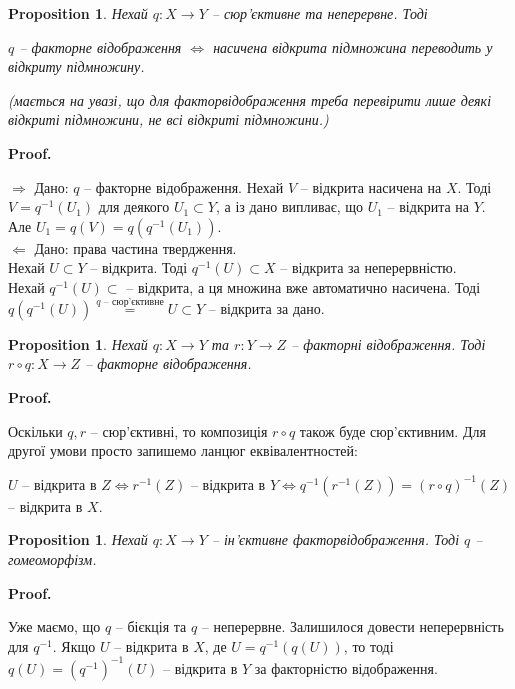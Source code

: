 \documentclass[a4paper, 10pt]{article}
\makeatletter
\def\rightproof{$\boxed{\Rightarrow}$ }
\def\leftproof{$\boxed{\Leftarrow}$ }
\theoremstyle{theoremdd}
\newtheorem{proposition}[theorem]{Proposition}
\renewenvironment{proof}[1][Proof.\\]{\par
\pushQED{\hfill \qed}%
\normalfont \topsep6\p@\@plus6\p@\relax
\trivlist
\item\relax
{\bfseries
#1\@addpunct{.}}\hspace\labelsep\ignorespaces
}{%
\popQED\endtrivlist\@endpefalse
}
\makeatother
\begin{document}
\begin{proposition}
Нехай $q \colon X \to Y$ -- сюр'єктивне та неперервне. Тоді
\begin{center}
$q$ -- факторне відображення $\iff$ насичена відкрита підмножина переводить у відкриту підмножину.
\end{center}
(\textit{мається на увазі, що для факторвідображення треба перевірити лише деякі відкриті підмножини, не всі відкриті підмножини}.)
\end{proposition}

\begin{proof}
\rightproof Дано: $q$ -- факторне відображення. Нехай $V$ -- відкрита насичена на $X$. Тоді $V = q^{-1}(U_1)$ для деякого $U_1 \subset Y$, а із дано випливає, що $U_1$ -- відкрита на $Y$. Але $U_1 = q(V) = q(q^{-1}(U_1))$.
\bigskip \\
\leftproof Дано: права частина твердження.\\
Нехай $U \subset Y$ -- відкрита. Тоді $q^{-1}(U) \subset X$ -- відкрита за неперервністю.\\
Нехай $q^{-1}(U) \subset$ -- відкрита, а ця множина вже автоматично насичена. Тоді $q(q^{-1}(U)) \overset{q \text{ --  сюр'єктивне}}{=} U \subset Y$ -- відкрита за дано.
\end{proof}

\begin{proposition}
Нехай $q \colon X \to Y$ та $r \colon Y \to Z$ -- факторні відображення. Тоді $r \circ q \colon X \to Z$ -- факторне відображення.
\end{proposition}

\begin{proof}
Оскільки $q,r$ -- сюр'єктивні, то композиція $r \circ q$ також буде сюр'єктивним. Для другої умови просто запишемо ланцюг еквівалентностей:
\begin{center}
$U$ -- відкрита в $Z \iff r^{-1}(Z)$ -- відкрита в $Y \iff q^{-1}(r^{-1}(Z)) = (r \circ q)^{-1}(Z)$ -- відкрита в $X$. \qedhere 
\end{center}
\end{proof}

\begin{proposition}
Нехай $q \colon X \to Y$ -- ін'єктивне факторвідображення. Тоді $q$ -- гомеоморфізм.
\end{proposition}

\begin{proof}
Уже маємо, що $q$ -- бієкція та $q$ -- неперервне. Залишилося довести неперервність для $q^{-1}$. Якщо $U$ -- відкрита в $X$, де $U = q^{-1}(q(U))$, то тоді $q(U) = (q^{-1})^{-1}(U)$ -- відкрита в $Y$ за факторністю відображення.
\end{proof}
\end{document}
